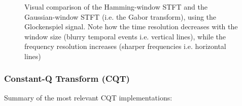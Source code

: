 \documentclass[report.tex]{subfiles}
\begin{document}
\begin{figure}[ht]
	\caption{Visual comparison of the Hamming-window STFT and the Gaussian-window STFT (i.e. the Gabor transform), using the Glockenspiel signal. Note how the time resolution decreases with the window size (blurry temporal events i.e. vertical lines), while the frequency resolution increases (sharper frequencies i.e. horizontal lines)}
	\label{fig:stfts}
\end{figure}

\newpagefill

\subsubsection{Constant-Q Transform (CQT)}

Summary of the most relevant CQT implementations:
\end{document}
